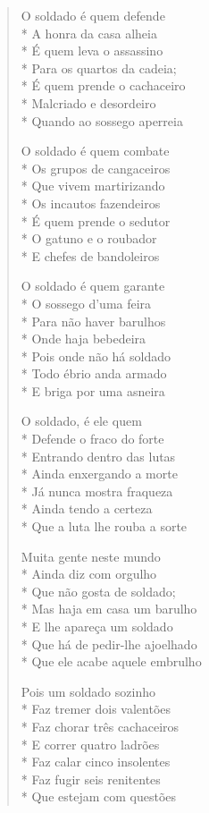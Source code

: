 \begin{verse}
O soldado é quem defende\\*
A honra da casa alheia\\*
É quem leva o assassino\\*
Para os quartos da cadeia;\\*
É quem prende o cachaceiro\\*
Malcriado e desordeiro\\*
Quando ao sossego aperreia

O soldado é quem combate\\*
Os grupos de cangaceiros\\*
Que vivem martirizando\\*
Os incautos fazendeiros\\*
É quem prende o sedutor\\*
O gatuno e o roubador\\*
E chefes de bandoleiros

O soldado é quem garante\\*
O sossego d'uma feira\\*
Para não haver barulhos\\*
Onde haja bebedeira\\*
Pois onde não há soldado\\*
Todo ébrio anda armado\\*
E briga por uma asneira

O soldado, é ele quem\\*
Defende o fraco do forte\\*
Entrando dentro das lutas\\*
Ainda enxergando a morte\\*
Já nunca mostra fraqueza\\*
Ainda tendo a certeza\\*
Que a luta lhe rouba a sorte

Muita gente neste mundo\\*
Ainda diz com orgulho\\*
Que não gosta de soldado;\\*
Mas haja em casa um barulho\\*
E lhe apareça um soldado\\*
Que há de pedir-lhe ajoelhado\\*
Que ele acabe aquele embrulho

Pois um soldado sozinho\\*
Faz tremer dois valentões\\*
Faz chorar três cachaceiros\\*
E correr quatro ladrões\\*
Faz calar cinco insolentes\\*
Faz fugir seis renitentes\\*
Que estejam com questões


\end{verse}
